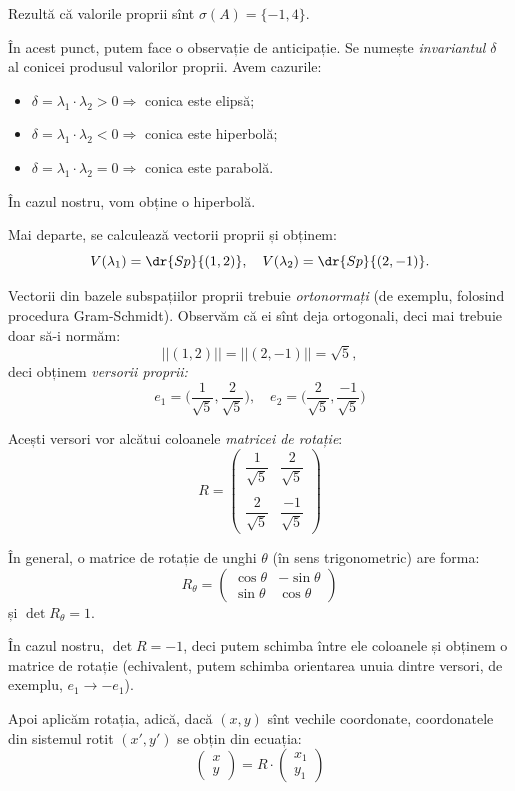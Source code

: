 Rezultă că valorile proprii sînt $ \sigma(A) = \{-1, 4 \} $.

În acest punct, putem face o observație de anticipație. Se numește
\emph{invariantul $ \delta $} al conicei produsul valorilor proprii.
Avem cazurile:
\begin{itemize}
\item $ \delta = \lambda_1 \cdot \lambda_2 > 0 \Rightarrow $ conica este elipsă;
\item $ \delta = \lambda_1 \cdot \lambda_2 < 0 \Rightarrow $ conica este hiperbolă;
\item $ \delta = \lambda_1 \cdot \lambda_2 = 0 \Rightarrow $ conica este parabolă.
\end{itemize}

În cazul nostru, vom obține o hiperbolă.

Mai departe, se calculează vectorii proprii și obținem:
\[
  V(\lambda_1) = \dr{Sp} \{(1, 2) \}, \quad V(\lambda_2) = \dr{Sp} \{(2, -1) \}.
\]

Vectorii din bazele subspațiilor proprii trebuie \emph{ortonormați} (de exemplu,
folosind procedura Gram-Schmidt). Observăm că ei sînt deja ortogonali, deci
mai trebuie doar să-i normăm:
\[
  ||(1, 2)|| = ||(2, -1)|| = \sqrt{5},
\]
deci obținem \emph{versorii proprii:}
\[
  e_1 = \Big(\frac{1}{\sqrt{5}}, \frac{2}{\sqrt{5}} \Big), \quad %
  e_2 = \Big(\frac{2}{\sqrt{5}}, \frac{-1}{\sqrt{5}} \Big)
\]

Acești versori vor alcătui coloanele \emph{matricei de rotație}:
\[
  R = \begin{pmatrix}
    \dfrac{1}{\sqrt{5}} & \dfrac{2}{\sqrt{5}} \\
                       & \\
    \dfrac{2}{\sqrt{5}} & \dfrac{-1}{\sqrt{5}}
  \end{pmatrix}
\]

În general, o matrice de rotație de unghi $ \theta $ (în sens trigonometric)
are forma:
\[
  R_\theta = \begin{pmatrix}
    \cos \theta & -\sin \theta \\
    \sin \theta & \cos \theta
  \end{pmatrix}
\]
și $ \det R_\theta = 1 $.

În cazul nostru, $ \det R = -1 $, deci putem schimba între ele coloanele
și obținem o matrice de rotație (echivalent, putem schimba orientarea unuia
dintre versori, de exemplu, $ e_1 \longrightarrow -e_1 $).

Apoi aplicăm rotația, adică, dacă $ (x, y) $ sînt vechile coordonate,
coordonatele din sistemul rotit $ (x', y') $ se obțin din ecuația:
\[
  \begin{pmatrix}
    x \\ y
  \end{pmatrix} = R \cdot \begin{pmatrix} x_1 \\ y_1 \end{pmatrix}
\]

